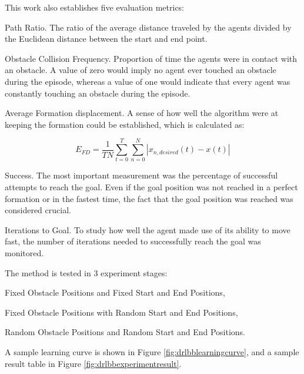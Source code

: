 This work also establishes five evaluation metrics:

\begin{compactenum}
	\item Path Ratio. 
	The ratio of the average distance traveled by the agents divided by the Euclidean distance between the start and end point.
	\item Obstacle Collision Frequency. 
	Proportion of time the agents were in contact with an obstacle. 
	A value of zero would imply no agent ever touched an obstacle during the episode, whereas a value of one would indicate that every agent was constantly touching an obstacle during the episode.
	\item Average Formation displacement. 
	A sense of how well the algorithm were at keeping the formation could be established, which is calculated as:
	
	\begin{equation}
		E_{FD}=\frac{1}{TN}\sum_{t=0}^{T}\sum_{n=0}^{N}|x_{n,desired}(t)-x(t)|
	\end{equation}
	
	\item Success. 
	The most important measurement was the percentage of successful attempts to reach the goal. 
	Even if the goal position was not reached in a perfect formation or in the fastest time, the fact that the goal position was reached was considered crucial.
	\item Iterations to Goal. 
	To study how well the agent made use of its ability to move fast, the number of iterations needed to successfully reach the goal was monitored.
\end{compactenum}

The method is tested in 3 experiment stages:

\begin{compactenum}
	\item Fixed Obstacle Positions and Fixed Start and End Positions,
	\item Fixed Obstacle Positions with Random Start and End Positions,
	\item Random Obstacle Positions and Random Start and End Positions.
\end{compactenum}

A sample learning curve is shown in Figure \ref{fig:drlbblearningcurve}, and a sample result table in Figure \ref{fig:drlbbexperimentresult}.

